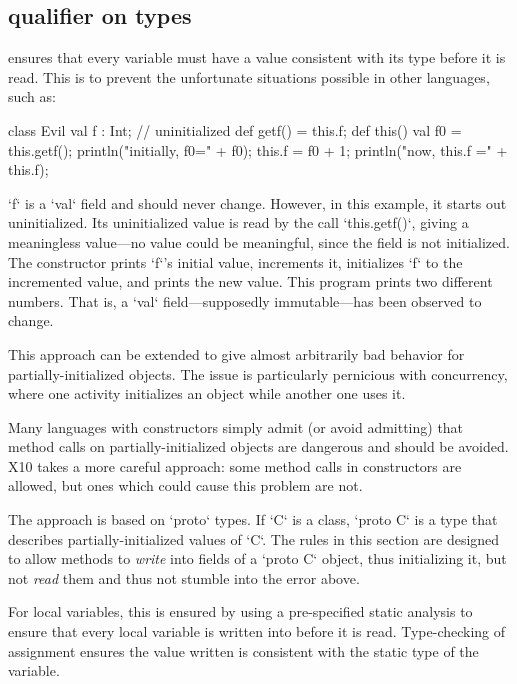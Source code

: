 \subsection{ qualifier on types}
\label{Prototypes}
\Xten{} ensures that every variable must have a value consistent with its type
before it is read.  This is to prevent the unfortunate situations possible in
other languages, such as: 
\begin{xten}
class Evil {
   val f : Int; // uninitialized
   def getf() = this.f;
   def this() { 
       val f0 = this.getf();
       println("initially, f0=" + f0);
       this.f = f0 + 1;
       println("now, this.f =" + this.f);
   }
}
\end{xten}
\noindent
\xcd`f` is a \xcd`val` field and should never change.  However, in this
example, it starts out uninitialized.  Its uninitialized value is read by the
call \xcd`this.getf()`, giving a meaningless value---no value could be
meaningful, since the field is not initialized.  The constructor prints
\xcd`f`'s initial value, increments it, initializes \xcd`f` to the incremented
value, and prints the new value.  This program prints two different numbers.
That is, a \xcd`val` field---supposedly immutable---has been observed to
change.  

This approach can be extended to give almost arbitrarily bad behavior 
for partially-initialized objects.  The issue is particularly pernicious with
concurrency, where one activity initializes an object while another one uses
it.  

Many languages with constructors simply admit (or avoid admitting) that method
calls on partially-initialized objects are dangerous and should be avoided.
X10 takes a more careful approach: some method calls in constructors are
allowed, but ones which could cause this problem are not.  

The approach is based on \xcd`proto` types. If \xcd`C` is a class, 
\xcd`proto C` is a type that describes partially-initialized values of
\xcd`C`.  The rules in this section are designed to allow methods to {\em
write} into fields of a \xcd`proto C` object, thus initializing it, but not
{\em read} them and thus not stumble into the error above.


For local variables, this is ensured by using a pre-specified static
analysis to ensure that every local variable is written into before it
is read. Type-checking of assignment ensures the value written is
consistent with the static type of the variable.

